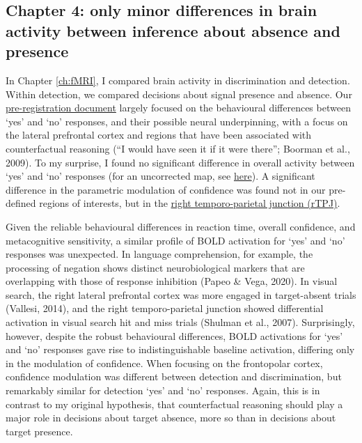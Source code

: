 \documentclass[12pt,twoside]{reedthesis}
\begin{document}
\hypertarget{chapter-4-only-minor-differences-in-brain-activity-between-inference-about-absence-and-presence}{%
\subsection*{Chapter 4: only minor differences in brain activity between inference about absence and presence}\label{chapter-4-only-minor-differences-in-brain-activity-between-inference-about-absence-and-presence}}

In Chapter \ref{ch:fMRI}, I compared brain activity in discrimination and detection. Within detection, we compared decisions about signal presence and absence. Our \href{https://github.com/matanmazor/detectionVsDiscrimination_fMRI/blob/master/protocol\%20folder/docs/Confidence\%20in\%20Detection\%20and\%20Discrimination.pdf}{pre-registration document} largely focused on the behavioural differences between `yes' and `no' responses, and their possible neural underpinning, with a focus on the lateral prefrontal cortex and regions that have been associated with counterfactual reasoning (``I would have seen it if it were there''; Boorman et al., 2009). To my surprise, I found no significant difference in overall activity between `yes' and `no' responses (for an uncorrected map, see \href{https://identifiers.org/neurovault.image:305384}{here}). A significant difference in the parametric modulation of confidence was found not in our pre-defined regions of interests, but in the \href{https://identifiers.org/neurovault.image:305379}{right temporo-parietal junction (rTPJ)}.

Given the reliable behavioural differences in reaction time, overall confidence, and metacognitive sensitivity, a similar profile of BOLD activation for `yes' and `no' responses was unexpected. In language comprehension, for example, the processing of negation shows distinct neurobiological markers that are overlapping with those of response inhibition (Papeo \& Vega, 2020). In visual search, the right lateral prefrontal cortex was more engaged in target-absent trials (Vallesi, 2014), and the right temporo-parietal junction showed differential activation in visual search hit and miss trials (Shulman et al., 2007). Surprisingly, however, despite the robust behavioural differences, BOLD activations for `yes' and `no' responses gave rise to indistinguishable baseline activation, differing only in the modulation of confidence. When focusing on the frontopolar cortex, confidence modulation was different between detection and discrimination, but remarkably similar for detection `yes' and `no' responses. Again, this is in contrast to my original hypothesis, that counterfactual reasoning should play a major role in decisions about target absence, more so than in decisions about target presence.
\end{document}
